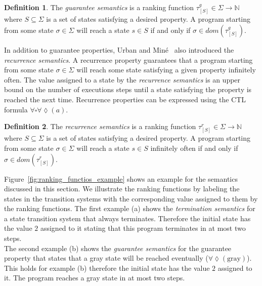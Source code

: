 \documentclass[11pt,a4paper,titlepage]{article}
\theoremstyle{definition}
\newtheorem{definition}{Definition}[section]
\begin{document}
\begin{definition}
    The \textit{guarantee semantics} is a ranking function 
    $\tau_{[S]}^{g} \in \Sigma \rightarrow \mathbb{N}$
    where $S \subseteq \Sigma$ is a set of states satisfying a desired property.
    A program starting from some state $\sigma \in \Sigma$ will reach a state 
    $s \in S$ if and only if $\sigma \in dom(\tau_{[S]}^{g})$.
\end{definition}

In addition to guarantee properties, Urban and Miné~\cite{UrbanM-VMCAI15} also introduced the \textit{recurrence semantics}.
A recurrence property guarantees that a program starting from some state $\sigma \in \Sigma$ will reach some state satisfying
a given property infinitely often. The value assigned to a state by the \textit{recurrence semantics}
is an upper bound on the number of executions steps until a state satisfying the property is reached the next time. 
Recurrence properties can be expressed using the CTL formula $\forall\square\forall\lozenge(a)$.

\begin{definition}
    The \textit{recurrence semantics} is a ranking function 
    $\tau_{[S]}^{r} \in \Sigma \rightarrow \mathbb{N}$
    where $S \subseteq \Sigma$ is a set of states satisfying a desired property.
    A program starting from some state $\sigma \in \Sigma$ will reach a state 
    $s \in S$ infinitely often if and only if $\sigma \in dom(\tau_{[S]}^{r})$.
\end{definition}

Figure~\ref{fig:ranking_functios_example} shows an example for the semantics discussed in this section.
We illustrate the ranking functions by labeling the states in the transition systems with the corresponding value assigned to them by the ranking functions. 
The first example (a) shows the \textit{termination semantics} for a state transition system that always terminates. Therefore the initial state
has the value $2$ assigned to it stating that this program terminates in at most two steps.\\

The second example (b) shows the \textit{guarantee semantics} for the guarantee property that states that a gray state will be reached eventually 
($\forall\lozenge(\text{gray})$).
This holds for example (b) therefore the initial state has the value $2$ assigned to it. The program reaches a gray state in at most two steps.\\
\end{document}
